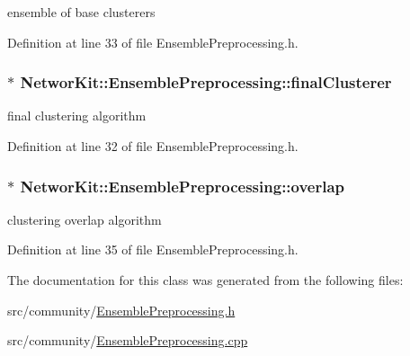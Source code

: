ensemble of base clusterers 



Definition at line 33 of file Ensemble\-Preprocessing.\-h.

\hypertarget{class_networ_kit_1_1_ensemble_preprocessing_a0d7d00c8a7f73b119af2e89df4151478}{
\subsubsection[{final\-Clusterer}]{$\ast$ Networ\-Kit\-::\-Ensemble\-Preprocessing\-::final\-Clusterer\hspace{0.3cm}{\ttfamily [protected]}}}\label{class_networ_kit_1_1_ensemble_preprocessing_a0d7d00c8a7f73b119af2e89df4151478}


final clustering algorithm 



Definition at line 32 of file Ensemble\-Preprocessing.\-h.

\hypertarget{class_networ_kit_1_1_ensemble_preprocessing_a2bf7860c6673aa0f0bafbe95fb7d2a87}{
\subsubsection[{overlap}]{$\ast$ Networ\-Kit\-::\-Ensemble\-Preprocessing\-::overlap\hspace{0.3cm}{\ttfamily [protected]}}}\label{class_networ_kit_1_1_ensemble_preprocessing_a2bf7860c6673aa0f0bafbe95fb7d2a87}


clustering overlap algorithm 



Definition at line 35 of file Ensemble\-Preprocessing.\-h.



The documentation for this class was generated from the following files\-:\begin{DoxyCompactItemize}
\item 
src/community/\hyperlink{_ensemble_preprocessing_8h}{Ensemble\-Preprocessing.\-h}\item 
src/community/\hyperlink{_ensemble_preprocessing_8cpp}{Ensemble\-Preprocessing.\-cpp}\end{DoxyCompactItemize}
